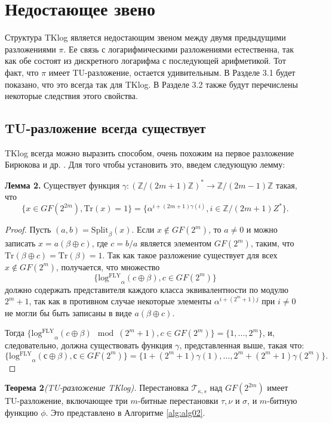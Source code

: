 \section{Недостающее звено}
Структура TKlog является недостающим звеном между двумя предыдущими разложениями \(\pi\). Ее связь с логарифмическими разложениями \cite{PU16} естественна, так как обе состоят из дискретного логарифма с последующей арифметикой. Тот факт, что \(\pi\) имеет TU-разложение, остается удивительным. В Разделе 3.1 будет показано, что это всегда так для TKlog. В Разделе 3.2 также будут перечислены некоторые следствия этого свойства.

\subsection{TU-разложение всегда существует}
TKlog всегда можно выразить способом, очень похожим на первое разложение Бирюкова и др. \cite{BPU16a}. Для того чтобы установить это, введем следующую лемму:

\textbf{Лемма 2.} Существует функция \(\gamma : (\mathbb{Z}/(2m + 1)\mathbb{Z})^* \to \mathbb{Z}/(2m - 1)\mathbb{Z}\) такая, что 
\[
\{x \in GF(2^{2m}), \mathrm{Tr}(x) = 1\} = \{\alpha^{i + (2m+1)\gamma(i)}, i \in \mathbb{Z}/(2m + 1)Z^*\}.
\]

\begin{proof}
Пусть \((a, b) = \mathrm{Split}_{\beta}(x)\). Если \(x \notin GF(2^m)\), то \(a \neq 0\) и можно записать \(x = a(\beta \oplus c)\), где \(c = b/a\) является элементом \(GF(2^m)\), таким, что \(\mathrm{Tr}(\beta \oplus c) = \mathrm{Tr}(\beta) = 1\). Так как такое разложение существует для всех \(x \notin GF(2^m)\), получается, что множество 
\[
\{\mathrm{log^{FLY}}_{\alpha}(c \oplus \beta), c \in GF(2^m)\}
\]
должно содержать представителя каждого класса эквивалентности по модулю \(2^m + 1\), так как в противном случае некоторые элементы \(\alpha^{i + (2^m+1)j}\) при \(i \neq 0\) не могли бы быть записаны в виде \(a(\beta \oplus c)\).

Тогда \(\{\mathrm{log^{FLY}}_{\alpha}(c \oplus \beta) \mod (2^m + 1), c \in GF(2^m)\} = \{1, \ldots, 2^m\}\),
и, следовательно, должна существовать функция \(\gamma\), представленная выше, такая что:
\[
\{\mathrm{log^{FLY}}_{\alpha}(с \oplus \beta), с \in GF(2^m)\} = \{1 + (2^m + 1)\gamma(1), \ldots, 2^m + (2^m + 1)\gamma(2^m)\}.
\]
\end{proof}

\textbf{Теорема 2}\textit{(TU-разложение TKlog).}
Перестановка \(\mathscr{T}_{\kappa, s}\) над \(GF(2^{2m})\) имеет TU-разложение, включающее три \(m\)-битные перестановки \(\tau, \nu\) и \(\sigma\), и \(m\)-битную функцию \(\phi\). Это представлено в Алгоритме \ref{alg:alg02}.

